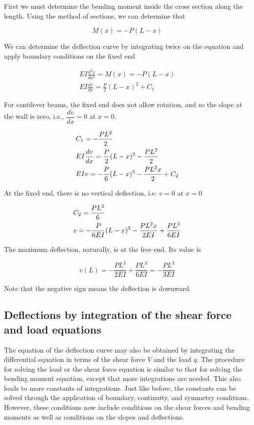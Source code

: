 \documentclass[
10pt,
a4paper,
openany,
svgnames,
]{book} %
\begin{document}
\begin{solution}
First we must determine the bending moment inside the cross section along the length. Using the method of sections, we can determine that

\[M(x) =  - P(L - x)\]	

We can determine the deflection curve by integrating twice on the equation and apply boundary conditions on the fixed end

\begin{gather*}
  EI\frac{d^2v}{dx^2} = M(x) =  - P(L - x) \\
  EI\frac{dv}{dx} = \frac{P}{2}(L - x)^2 + C_1
\end{gather*}

For cantilever beams, the fixed end does not allow rotation, and so the slope at the wall is zero, i.e., $\dfrac{dv}{dx} = 0$ at $x = 0$.

\begin{gather*}
  C_1 =  - \frac{PL^2}{2} \hfill \\
  EI\frac{dv}{dx} = \frac{P}{2}(L - x)^2 - \frac{PL^2}{2} \hfill \\
  EIv =  - \frac{P}{6}{(L - x)^3} - \frac{PL^2x}{2} + C_2 \hfill
\end{gather*}

At the fixed end, there is no vertical deflection, i.e. $v = 0$ at $x = 0$

\begin{gather*}
  C_2 = \frac{PL^3}{6} \hfill \\
  v =  - \frac{P}{6EI}(L - x)^3 - \frac{PL^2x}{2EI} + \frac{PL^3}{6EI} \hfill \\ 
\end{gather*}

The maximum deflection, naturally, is at the free end. Its value is

\[v(L) =  - \frac{PL^3}{2EI} + \frac{PL^3}{6EI} =  - \frac{PL^3}{3EI}\]

Note that the negative sign means the deflection is downward.
\end{solution}

\subsection{Deflections by integration of the shear force and load equations}

The equation of the deflection curve may also be obtained by integrating the differential equation in terms of the shear force $V$ and the load $q$. The procedure for solving the load or the shear force equation is similar to that for solving the bending moment equation, except that more integrations are needed. This also leads to more constants of integrations. Just like before, the constants can be solved through the application of boundary, continuity, and symmetry conditions. However, these conditions now include conditions on the shear forces and bending moments as well as conditions on the slopes and deflections.
\end{document}
